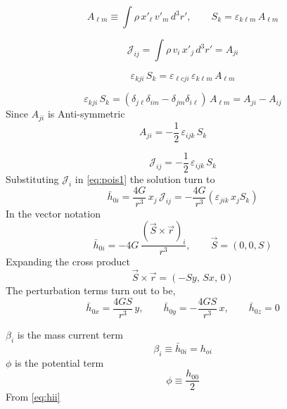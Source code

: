 \documentclass[12pt, a4paper]{article}
\theoremstyle{plain}
\theoremstyle{definition}
\theoremstyle{remark}
\begin{document}
\begin{equation}
    A_{\ell m} \equiv \int \rho\, x'_\ell\, v'_m\, d^3r', \qquad S_k = \varepsilon_{k\ell m}\, A_{\ell m}
\end{equation}

\begin{equation}
    \mathcal{J}_{ij} = \int \rho\, v_i\, x'_j\, d^3r' = A_{ji}
\end{equation}

\begin{equation}
    \varepsilon_{kji}\, S_k = \varepsilon_{\ell c j i}\, \varepsilon_{k\ell m}\, A_{\ell m}
\end{equation}

\begin{equation}
    \varepsilon_{kji}\, S_k = (\delta_{j\ell}\delta_{im} - \delta_{jm}\delta_{i\ell})\, A_{\ell m} = A_{ji} - A_{ij}
\end{equation}
Since $A_{ji}$ is Anti-symmetric 
\begin{equation}
    A_{ji} = -\frac{1}{2}\,\varepsilon_{ijk}\, S_k \qquad 
\end{equation}

\begin{equation}
    \mathcal{J}_{ij} = -\frac{1}{2}\,\varepsilon_{ijk}\, S_k
\end{equation}
Substituting $\mathcal{J}_i$ in \eqref{eq:pois1} the solution turn to 
\begin{equation}
    \bar h_{0i} = \frac{4G}{r^3}\, x_j\, \mathcal{J}_{ij} = -\frac{4G}{r^3}(\varepsilon_{jik}\, x_j S_k)
\end{equation}
In the vector notation
\begin{equation}
  \bar  h_{0i} = -4G\,\frac{(\vec{S} \times \vec{r})_i}{r^3}, \qquad \vec{S} = (0,0,S)
\end{equation}
Expanding the cross product
\begin{equation}
    \vec{S} \times \vec{r} = (-Sy,\, Sx,\, 0)
\end{equation}
The perturbation terms turn out to be,
\begin{equation}
    \bar h_{0x} = \frac{4GS}{r^3}\, y, \qquad \bar h_{0y} = -\frac{4GS}{r^3}\, x, \qquad \bar h_{0z} = 0
    \label{eq:beta}
\end{equation}

 $\beta_i$ is the mass current term 
 \begin{equation}
     \beta_i \equiv \bar h_{0i}=h_{oi}
 \end{equation}
 $\phi$ is the potential term 
 \begin{equation}
     \phi \equiv \frac{h_{00}}{2} 
 \end{equation}
 From \eqref{eq:hii} 
\end{document}
